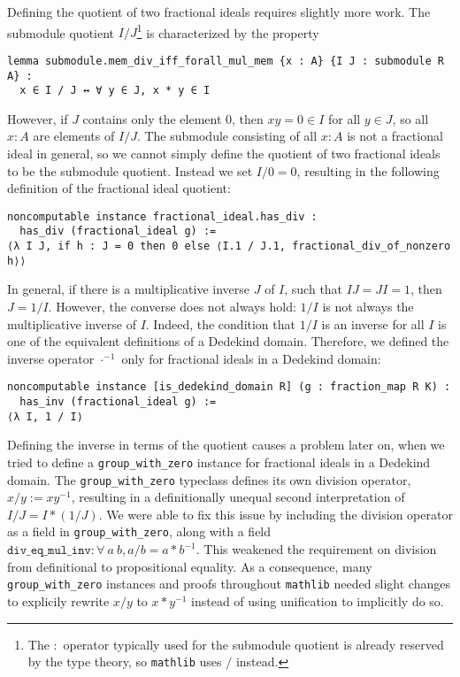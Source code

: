\documentclass{lipics-v2021}
\newcommand{\lean}[1]{\texttt{#1}\xspace} %
\newcommand{\mathlib}{\texttt{mathlib}\xspace}
\begin{document}
Defining the quotient of two fractional ideals requires slightly more work.
The submodule quotient $I / J$\footnote{The $:$ operator typically used for the submodule quotient is already reserved by the type theory, so \mathlib uses $/$ instead.} is characterized by the property
\begin{lstlisting}
lemma submodule.mem_div_iff_forall_mul_mem {x : A} {I J : submodule R A} :
  x ∈ I / J ↔ ∀ y ∈ J, x * y ∈ I
\end{lstlisting}
However, if $J$ contains only the element $0$,
then $xy = 0 \in I$ for all $y \in J$, so all $x : A$ are elements of $I / J$.
The submodule consisting of all $x : A$ is not a fractional ideal in general,
so we cannot simply define the quotient of two fractional ideals to be the submodule quotient.
Instead we set $I / 0 = 0$, resulting in the following definition of the fractional ideal quotient:
\begin{lstlisting}
noncomputable instance fractional_ideal.has_div :
  has_div (fractional_ideal g) :=
⟨λ I J, if h : J = 0 then 0 else ⟨I.1 / J.1, fractional_div_of_nonzero h⟩⟩
\end{lstlisting}

In general, if there is a multiplicative inverse $J$ of $I$, such that $I J = J I = 1$, then $J = 1 / I$.
However, the converse does not always hold: $1 / I$ is not always the multiplicative inverse of $I$.
Indeed, the condition that $1 / I$ is an inverse for all $I$ is one of the equivalent definitions of a Dedekind domain.
Therefore, we defined the inverse operator $\cdot^{-1}$ only for fractional ideals in a Dedekind domain:
\begin{lstlisting}
noncomputable instance [is_dedekind_domain R] (g : fraction_map R K) :
  has_inv (fractional_ideal g) :=
⟨λ I, 1 / I⟩
\end{lstlisting}

Defining the inverse in terms of the quotient causes a problem later on, when we tried to define a \lean{group\_with\_zero} instance for fractional ideals in a Dedekind domain.
The \lean{group\_with\_zero} typeclass defines its own division operator, $x / y := x y^{-1}$,
resulting in a definitionally unequal second interpretation of $I / J = I * (1 / J)$.
We were able to fix this issue by including the division operator as a field in \lean{group\_with\_zero},
along with a field $\lean{div\_eq\_mul\_inv} : \forall\ a\ b, a / b = a * b^{-1}$.
This weakened the requirement on division from definitional to propositional equality.
As a consequence, many \lean{group\_with\_zero} instances and proofs throughout \mathlib needed slight changes to explicily rewrite $x / y$ to $x * y^{-1}$ instead of using unification to implicitly do so.
\end{document}

